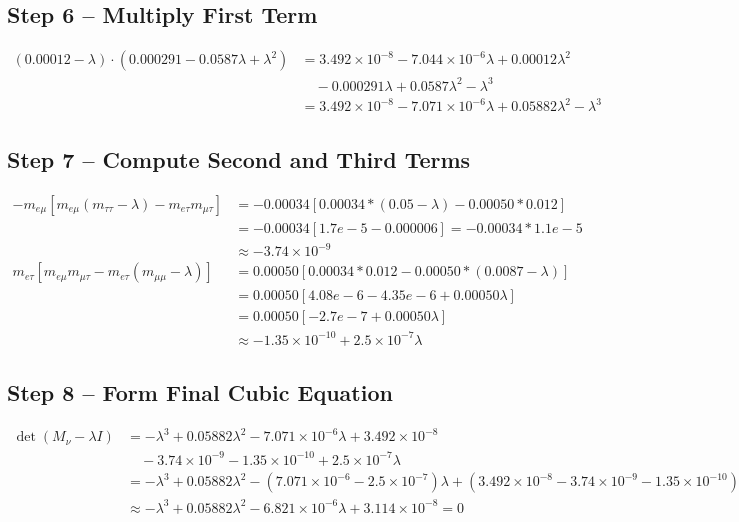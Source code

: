 \documentclass[12pt,a4paper]{article}
\begin{document}
\subsection{Step 6 – Multiply First Term}

\begin{align}
	(0.00012-\lambda) \cdot (0.000291 - 0.0587 \lambda + \lambda^2) &= 3.492 \times 10^{-8} - 7.044 \times 10^{-6}\lambda + 0.00012 \lambda^2 \\
	&\quad - 0.000291 \lambda + 0.0587 \lambda^2 - \lambda^3 \\
	&= 3.492 \times 10^{-8} - 7.071 \times 10^{-6}\lambda + 0.05882 \lambda^2 - \lambda^3
\end{align}

\subsection{Step 7 – Compute Second and Third Terms}

\begin{align}
	- m_{e\mu} [ m_{e\mu} (m_{\tau\tau}-\lambda) - m_{e\tau} m_{\mu\tau} ] &= -0.00034 [ 0.00034*(0.05-\lambda) - 0.00050*0.012 ] \\
	&= -0.00034 [ 1.7e-5 - 0.000006 ] = -0.00034 * 1.1e-5 \\
	&\approx -3.74 \times 10^{-9} \\
	m_{e\tau}[ m_{e\mu} m_{\mu\tau} - m_{e\tau}(m_{\mu\mu}-\lambda) ] &= 0.00050[ 0.00034*0.012 - 0.00050*(0.0087-\lambda) ] \\
	&= 0.00050[ 4.08e-6 - 4.35e-6 + 0.00050 \lambda ] \\
	&= 0.00050[ -2.7e-7 + 0.00050 \lambda ] \\
	&\approx -1.35 \times 10^{-10} + 2.5 \times 10^{-7} \lambda
\end{align}

\subsection{Step 8 – Form Final Cubic Equation}

\begin{align}
	\det(M_\nu - \lambda I) &= -\lambda^3 + 0.05882 \lambda^2 - 7.071 \times 10^{-6} \lambda + 3.492 \times 10^{-8} \\
	&\quad - 3.74 \times 10^{-9} - 1.35 \times 10^{-10} + 2.5 \times 10^{-7} \lambda \\
	&= -\lambda^3 + 0.05882 \lambda^2 - (7.071 \times 10^{-6} - 2.5 \times 10^{-7}) \lambda + (3.492 \times 10^{-8} - 3.74 \times 10^{-9} -1.35 \times 10^{-10}) \\
	&\approx -\lambda^3 + 0.05882 \lambda^2 - 6.821 \times 10^{-6} \lambda + 3.114 \times 10^{-8} = 0
\end{align}
\end{document}
